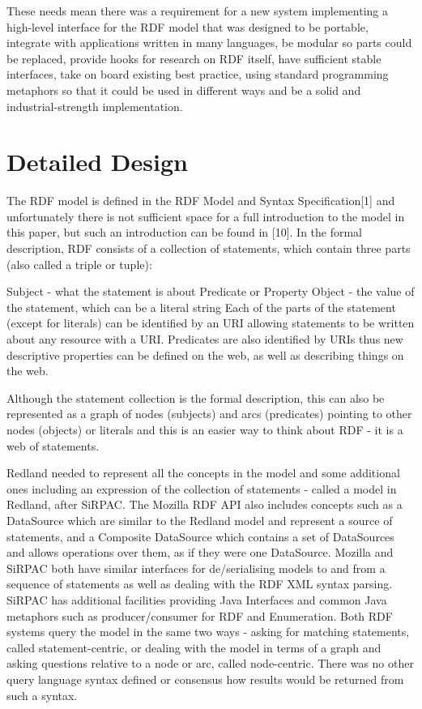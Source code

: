 \documentclass[11pt]{article}
\begin{document}
    These needs mean there was a requirement for a new system implementing a high-level interface for the RDF model that was designed to be portable, integrate with applications written in many languages, be modular so parts could be replaced, provide hooks for research on RDF itself, have sufficient stable interfaces, take on board existing best practice, using standard programming metaphors so that it could be used in different ways and be a solid and industrial-strength implementation.


    \section{Detailed Design}
    The RDF model is defined in the RDF Model and Syntax Specification[1] and unfortunately there is not sufficient space for a full introduction to the model in this paper, but such an introduction can be found in [10]. In the formal description, RDF consists of a collection of statements, which contain three parts (also called a triple or tuple):

    Subject - what the statement is about
    Predicate or Property
    Object - the value of the statement, which can be a literal string
    Each of the parts of the statement (except for literals) can be identified by an URI allowing statements to be written about any resource with a URI. Predicates are also identified by URIs thus new descriptive properties can be defined on the web, as well as describing things on the web.

    Although the statement collection is the formal description, this can also be represented as a graph of nodes (subjects) and arcs (predicates) pointing to other nodes (objects) or literals and this is an easier way to think about RDF - it is a web of statements.

    Redland needed to represent all the concepts in the model and some additional ones including an expression of the collection of statements - called a model in Redland, after SiRPAC. The Mozilla RDF API also includes concepts such as a DataSource which are similar to the Redland model and represent a source of statements, and a Composite DataSource which contains a set of DataSources and allows operations over them, as if they were one DataSource. Mozilla and SiRPAC both have similar interfaces for de/serialising models to and from a sequence of statements as well as dealing with the RDF XML syntax parsing. SiRPAC has additional facilities providing Java Interfaces and common Java metaphors such as producer/consumer for RDF and Enumeration. Both RDF systems query the model in the same two ways - asking for matching statements, called statement-centric, or dealing with the model in terms of a graph and asking questions relative to a node or arc, called node-centric. There was no other query language syntax defined or consensus how results would be returned from such a syntax.
\end{document}
